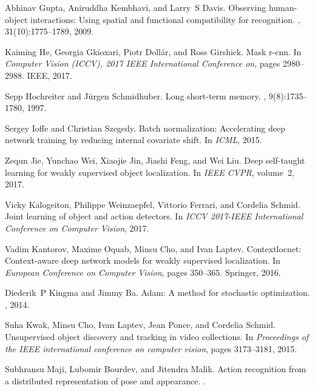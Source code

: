 \documentclass[10pt,twocolumn,letterpaper]{article}
\begin{document}
{\begin{thebibliography}{10}
Abhinav Gupta, Aniruddha Kembhavi, and Larry~S Davis.
\newblock Observing human-object interactions: Using spatial and functional
  compatibility for recognition.
,
  31(10):1775--1789, 2009.

Kaiming He, Georgia Gkioxari, Piotr Doll{\'a}r, and Ross Girshick.
\newblock Mask r-cnn.
\newblock In {\em Computer Vision (ICCV), 2017 IEEE International Conference
  on}, pages 2980--2988. IEEE, 2017.

Sepp Hochreiter and J{\"u}rgen Schmidhuber.
\newblock Long short-term memory.
, 9(8):1735--1780, 1997.

Sergey Ioffe and Christian Szegedy.
\newblock Batch normalization: Accelerating deep network training by reducing
  internal covariate shift.
\newblock In {\em ICML}, 2015.

Zequn Jie, Yunchao Wei, Xiaojie Jin, Jiashi Feng, and Wei Liu.
\newblock Deep self-taught learning for weakly supervised object localization.
\newblock In {\em IEEE CVPR}, volume~2, 2017.

Vicky Kalogeiton, Philippe Weinzaepfel, Vittorio Ferrari, and Cordelia Schmid.
\newblock Joint learning of object and action detectors.
\newblock In {\em ICCV 2017-IEEE International Conference on Computer Vision},
  2017.

Vadim Kantorov, Maxime Oquab, Minsu Cho, and Ivan Laptev.
\newblock Contextlocnet: Context-aware deep network models for weakly
  supervised localization.
\newblock In {\em European Conference on Computer Vision}, pages 350--365.
  Springer, 2016.

Diederik~P Kingma and Jimmy Ba.
\newblock Adam: A method for stochastic optimization.
, 2014.

Suha Kwak, Minsu Cho, Ivan Laptev, Jean Ponce, and Cordelia Schmid.
\newblock Unsupervised object discovery and tracking in video collections.
\newblock In {\em Proceedings of the IEEE international conference on computer
  vision}, pages 3173--3181, 2015.

Subhransu Maji, Lubomir Bourdev, and Jitendra Malik.
\newblock Action recognition from a distributed representation of pose and
  appearance.
.


\end{thebibliography}}
\end{document}

